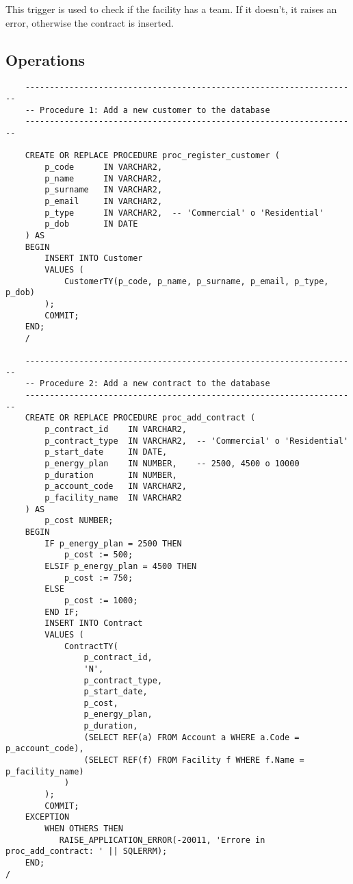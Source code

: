 This trigger is used to check if the facility has a team. If it doesn't, it raises an error, otherwise the contract is inserted.

\subsection{Operations}

\begin{lstlisting}
    --------------------------------------------------------------------
    -- Procedure 1: Add a new customer to the database
    --------------------------------------------------------------------
    
    CREATE OR REPLACE PROCEDURE proc_register_customer (
        p_code      IN VARCHAR2,
        p_name      IN VARCHAR2,
        p_surname   IN VARCHAR2,
        p_email     IN VARCHAR2,
        p_type      IN VARCHAR2,  -- 'Commercial' o 'Residential'
        p_dob       IN DATE
    ) AS
    BEGIN
        INSERT INTO Customer
        VALUES (
            CustomerTY(p_code, p_name, p_surname, p_email, p_type, p_dob)
        );
        COMMIT;
    END;
    /
    
    --------------------------------------------------------------------
    -- Procedure 2: Add a new contract to the database
    --------------------------------------------------------------------
    CREATE OR REPLACE PROCEDURE proc_add_contract (
        p_contract_id    IN VARCHAR2,
        p_contract_type  IN VARCHAR2,  -- 'Commercial' o 'Residential'
        p_start_date     IN DATE,
        p_energy_plan    IN NUMBER,    -- 2500, 4500 o 10000
        p_duration       IN NUMBER,    
        p_account_code   IN VARCHAR2,
        p_facility_name  IN VARCHAR2
    ) AS
        p_cost NUMBER;
    BEGIN
        IF p_energy_plan = 2500 THEN
            p_cost := 500;
        ELSIF p_energy_plan = 4500 THEN
            p_cost := 750;
        ELSE
            p_cost := 1000;
        END IF;
        INSERT INTO Contract
        VALUES (
            ContractTY(
                p_contract_id,
                'N',
                p_contract_type,
                p_start_date,
                p_cost,
                p_energy_plan,
                p_duration,
                (SELECT REF(a) FROM Account a WHERE a.Code = p_account_code),
                (SELECT REF(f) FROM Facility f WHERE f.Name = p_facility_name)
            )
        );
        COMMIT;
    EXCEPTION
        WHEN OTHERS THEN
           RAISE_APPLICATION_ERROR(-20011, 'Errore in proc_add_contract: ' || SQLERRM);
    END;
/


\end{lstlisting}
